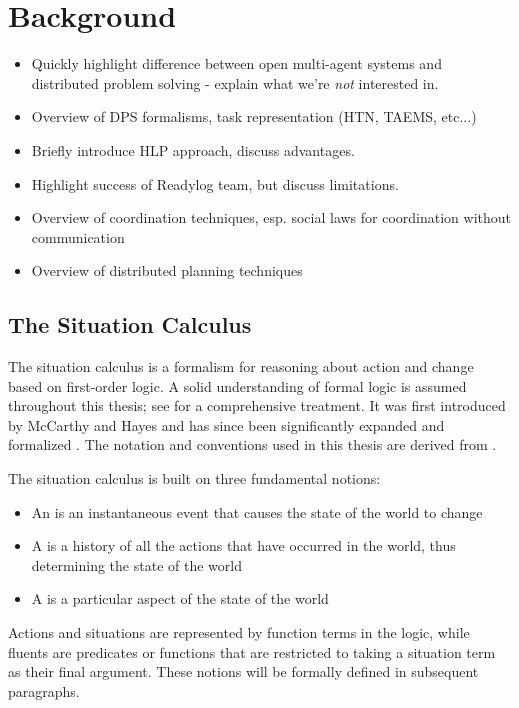  


\chapter{Background}

\label{ch:background} 

\begin{itemize}
\item Quickly highlight difference between open multi-agent systems and
distributed problem solving - explain what we're \emph{not} interested
in. 
\item Overview of DPS formalisms, task representation (HTN, TAEMS, etc...) 
\item Briefly introduce HLP approach, discuss advantages. 
\item Highlight success of Readylog team, but discuss limitations. 
\item Overview of coordination techniques, esp. social laws for coordination
without communication 
\item Overview of distributed planning techniques \cite{desjardins99survey_dist_planning} 
\end{itemize}

\section{The Situation Calculus}

The situation calculus is a formalism for reasoning about action and
change based on first-order logic. A solid understanding of formal
logic is assumed throughout this thesis; see \cite{fitting96fol_book}
for a comprehensive treatment. It was first introduced by McCarthy
and Hayes \cite{McCHay69sitcalc} and has since been significantly
expanded and formalized \cite{reiter91frameprob,pirri99contributions_sitcalc,levesque98sc_foundations}.
The notation and conventions used in this thesis are derived from
\cite{levesque98sc_foundations}.

The situation calculus is built on three fundamental notions: 

\begin{itemize}
\item An  is an instantaneous event that causes the state of
the world to change 
\item A  is a history of all the actions that have occurred
in the world, thus determining the state of the world 
\item A  is a particular aspect of the state of the world 
\end{itemize}
Actions and situations are represented by function terms in the logic,
while fluents are predicates or functions that are restricted to taking
a situation term as their final argument. These notions will be formally
defined in subsequent paragraphs.


